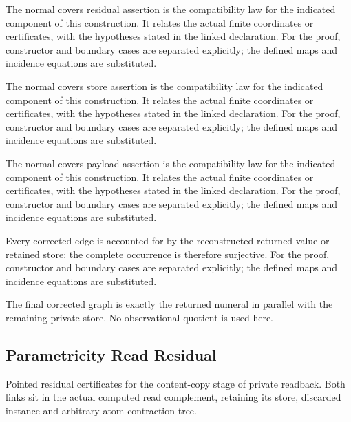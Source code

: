 The normal covers residual assertion is the compatibility law for the indicated component of this construction. It relates the actual finite coordinates or certificates, with the hypotheses stated in the linked declaration.
For the proof, constructor and boundary cases are separated explicitly; the defined maps and incidence equations are substituted.
\par{}

The normal covers store assertion is the compatibility law for the indicated component of this construction. It relates the actual finite coordinates or certificates, with the hypotheses stated in the linked declaration.
For the proof, constructor and boundary cases are separated explicitly; the defined maps and incidence equations are substituted.
\par{}

The normal covers payload assertion is the compatibility law for the indicated component of this construction. It relates the actual finite coordinates or certificates, with the hypotheses stated in the linked declaration.
For the proof, constructor and boundary cases are separated explicitly; the defined maps and incidence equations are substituted.
\par{}

Every corrected edge is accounted for by the reconstructed returned value or retained store; the complete occurrence is therefore surjective.
For the proof, constructor and boundary cases are separated explicitly; the defined maps and incidence equations are substituted.
\par{}

The final corrected graph is exactly the returned numeral in parallel with the remaining private store. No observational quotient is used here.
\par{}

\subsection{Parametricity Read Residual}
Pointed residual certificates for the content-copy stage of private readback. Both links sit in the actual computed read complement, retaining its store, discarded instance and arbitrary atom contraction tree.

